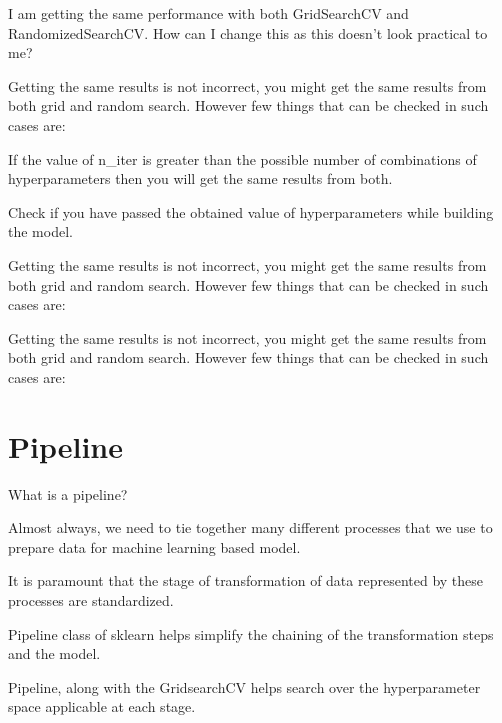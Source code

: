 	\begin{qanda}
		\begin{question}
I am getting the same performance with both GridSearchCV and RandomizedSearchCV.  How can I change this as this doesn't look practical to me?
		\end{question}

		\begin{answer}
Getting the same results is not incorrect, you might get the same results from both grid and random search.  However few things that can be checked in such cases are:
	\begin{bulletedlist}
		\item If the value of n\_iter is greater than the possible number of combinations of hyperparameters then you will get the same results from both.
		\item Check if you have passed the obtained value of hyperparameters while building the model.
	\end{bulletedlist}

Getting the same results is not incorrect, you might get the same results from both grid and random search.  However few things that can be checked in such cases are:

Getting the same results is not incorrect, you might get the same results from both grid and random search.  However few things that can be checked in such cases are:
		\end{answer}
	\end{qanda}


	\section{Pipeline}
What is a pipeline?
	\begin{bulletedlist}
		\item Almost always, we need to tie together many different processes that we use to prepare data for machine learning based model.
		\item It is paramount that the stage of transformation of data represented by these processes are standardized.
		\item Pipeline class of sklearn helps simplify the chaining of the transformation steps and the model.
		\item Pipeline, along with the GridsearchCV helps search over the hyperparameter space applicable at each stage.
	\end{bulletedlist}

